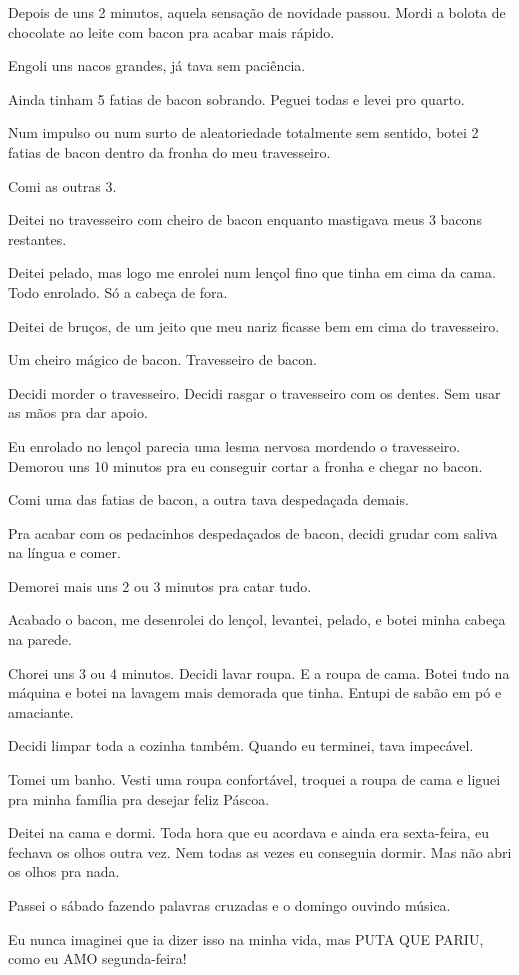 Depois de uns 2 minutos, aquela sensação de novidade passou. Mordi a bolota de chocolate ao leite com bacon pra acabar mais rápido.

Engoli uns nacos grandes, já tava sem paciência.

Ainda tinham 5 fatias de bacon sobrando. Peguei todas e levei pro quarto.

Num impulso ou num surto de aleatoriedade totalmente sem sentido, botei 2 fatias de bacon dentro da fronha do meu travesseiro.

\enlargethispage{\baselineskip}

Comi as outras 3.

Deitei no travesseiro com cheiro de bacon enquanto mastigava meus 3 bacons restantes.

Deitei pelado, mas logo me enrolei num lençol fino que tinha em cima da cama. Todo enrolado. Só a cabeça de fora.

Deitei de bruços, de um jeito que meu nariz ficasse bem em cima do travesseiro.

Um cheiro mágico de bacon. Travesseiro de bacon.

Decidi morder o travesseiro. Decidi rasgar o travesseiro com os dentes. Sem usar as mãos pra dar apoio.

Eu enrolado no lençol parecia uma lesma nervosa mordendo o travesseiro. Demorou uns 10 minutos pra eu conseguir cortar a fronha e chegar no bacon.

Comi uma das fatias de bacon, a outra tava despedaçada demais.

Pra acabar com os pedacinhos despedaçados de bacon, decidi grudar com saliva na língua e comer.

Demorei mais uns 2 ou 3 minutos pra catar tudo.

Acabado o bacon, me desenrolei do lençol, levantei, pelado, e botei minha cabeça na parede.

Chorei uns 3 ou 4 minutos. Decidi lavar roupa. E a roupa de cama. Botei tudo na máquina e botei na lavagem mais demorada que tinha. Entupi de sabão em pó e amaciante.

Decidi limpar toda a cozinha também. Quando eu terminei, tava impecável.

Tomei um banho. Vesti uma roupa confortável, troquei a roupa de cama e liguei pra minha família pra desejar feliz Páscoa.

\enlargethispage{\baselineskip}

Deitei na cama e dormi. Toda hora que eu acordava e ainda era sexta-feira, eu fechava os olhos outra vez. Nem todas as vezes eu conseguia dormir. Mas não abri os olhos pra nada.

Passei o sábado fazendo palavras cruzadas e o domingo ouvindo música.

Eu nunca imaginei que ia dizer isso na minha vida, mas PUTA QUE PARIU, como eu AMO segunda-feira!
